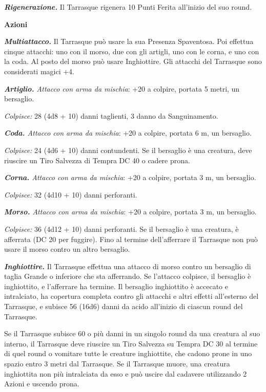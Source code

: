 \begin{multicols}{2}
{\emph{\textbf{Rigenerazione.}} Il Tarrasque rigenera 10 Punti Ferita all'inizio del suo round.

\textbf{Azioni}

\emph{\textbf{Multiattacco.}} Il Tarrasque può usare la sua Presenza Spaventosa. Poi effettua cinque attacchi: uno con il morso, due con gli artigli, uno con le corna, e uno con la coda. Al posto del morso può usare Inghiottire. Gli attacchi del Tarrasque sono considerati magici +4.

\emph{\textbf{Artiglio.} Attacco con arma da mischia}: +20 a colpire, portata 5 metri, un bersaglio.

\emph{Colpisce:} 28 (4d8 + 10) danni taglienti, 3 danno da Sanguinamento.

\emph{\textbf{Coda.} Attacco con arma da mischia}: +20 a colpire, portata 6 m, un bersaglio.

\emph{Colpisce:} 24 (4d6 + 10) danni contundenti. Se il bersaglio è una creatura, deve riuscire un Tiro Salvezza di Tempra DC 40 o cadere prona.

\emph{\textbf{Corna.} Attacco con arma da mischia}: +20 a colpire, portata 3 m, un bersaglio.

\emph{Colpisce:} 32 (4d10 + 10) danni perforanti.

\emph{\textbf{Morso.} Attacco con arma da mischia}: +20 a colpire, portata 3 m, un bersaglio.

\emph{Colpisce:} 36 (4d12 + 10) danni perforanti. Se il bersaglio è una creatura, è afferrata (DC 20 per fuggire). Fino al termine dell'afferrare il Tarrasque non può usare il morso contro un altro bersaglio.

\emph{\textbf{Inghiottire.}} Il Tarrasque effettua una attacco di morso contro un bersaglio di taglia Grande o inferiore che sta afferrando. Se l'attacco colpisce, il bersaglio è inghiottito, e l'afferrare ha termine. Il bersaglio inghiottito è accecato e intralciato, ha copertura completa contro gli attacchi e altri effetti all'esterno del Tarrasque, e subisce 56 (16d6) danni da acido all'inizio di ciascun round del Tarrasque.

Se il Tarrasque subisce 60 o più danni in un singolo round da una creatura al suo interno, il Tarrasque deve riuscire un Tiro Salvezza su Tempra DC 30 al termine di quel round o vomitare tutte le creature inghiottite, che cadono prone in uno spazio entro 3 metri dal Tarrasque. Se il Tarrasque muore, una creatura inghiottita non più intralciata da esso e può uscire dal cadavere utilizzando 2 Azioni e uscendo prona.

}
\end{multicols}
